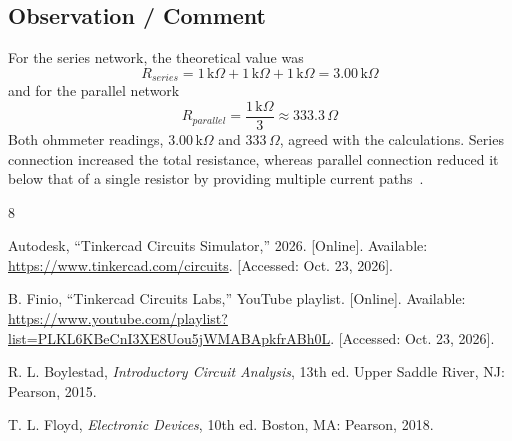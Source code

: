 \documentclass[11pt,a4paper]{article}
\begin{document}
\subsection{Observation / Comment}
For the series network, the theoretical value was
\[
R_{series} = 1\,\text{k}\Omega + 1\,\text{k}\Omega + 1\,\text{k}\Omega = 3.00\,\text{k}\Omega
\]
and for the parallel network
\[
R_{parallel} = \frac{1\,\text{k}\Omega}{3} \approx 333.3\,\Omega
\]
Both ohmmeter readings, $3.00\,\text{k}\Omega$ and $333\,\Omega$, agreed with the calculations. Series connection increased the total resistance, whereas parallel connection reduced it below that of a single resistor by providing multiple current paths~\cite{ref_boylestad}.

\begin{thebibliography}{8}

Autodesk, ``Tinkercad Circuits Simulator,'' 2026. [Online]. Available: \url{https://www.tinkercad.com/circuits}. [Accessed: Oct. 23, 2026].

B. Finio, ``Tinkercad Circuits Labs,'' YouTube playlist. [Online]. Available: \url{https://www.youtube.com/playlist?list=PLKL6KBeCnI3XE8Uou5jWMABApkfrABh0L}. [Accessed: Oct. 23, 2026].

R. L. Boylestad, \emph{Introductory Circuit Analysis}, 13th ed. Upper Saddle River, NJ: Pearson, 2015.

T. L. Floyd, \emph{Electronic Devices}, 10th ed. Boston, MA: Pearson, 2018.

\end{thebibliography}
\end{document}
